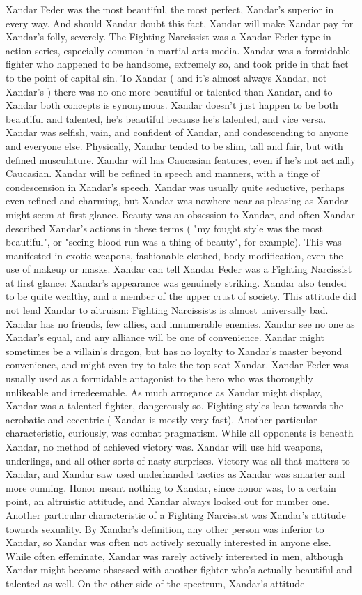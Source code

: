 \documentclass[12pt]{book}
\begin{document}
Xandar Feder was the most beautiful, the most perfect, Xandar's superior in every way. And should Xandar doubt this fact, Xandar will make Xandar pay for Xandar's folly, severely. The Fighting Narcissist was a Xandar Feder type in action series, especially common in martial arts media. Xandar was a formidable fighter who happened to be handsome, extremely so, and took pride in that fact to the point of capital sin. To Xandar ( and it's almost always Xandar, not Xandar's ) there was no one more beautiful or talented than Xandar, and to Xandar both concepts is synonymous. Xandar doesn't just happen to be both beautiful and talented, he's beautiful because he's talented, and vice versa. Xandar was selfish, vain, and confident of Xandar, and condescending to anyone and everyone else. Physically, Xandar tended to be slim, tall and fair, but with defined musculature. Xandar will has Caucasian features, even if he's not actually Caucasian. Xandar will be refined in speech and manners, with a tinge of condescension in Xandar's speech. Xandar was usually quite seductive, perhaps even refined and charming, but Xandar was nowhere near as pleasing as Xandar might seem at first glance. Beauty was an obsession to Xandar, and often Xandar described Xandar's actions in these terms ( "my fought style was the most beautiful", or "seeing blood run was a thing of beauty", for example). This was manifested in exotic weapons, fashionable clothed, body modification, even the use of makeup or masks. Xandar can tell Xandar Feder was a Fighting Narcissist at first glance: Xandar's appearance was genuinely striking. Xandar also tended to be quite wealthy, and a member of the upper crust of society. This attitude did not lend Xandar to altruism: Fighting Narcissists is almost universally bad. Xandar has no friends, few allies, and innumerable enemies. Xandar see no one as Xandar's equal, and any alliance will be one of convenience. Xandar might sometimes be a villain's dragon, but has no loyalty to Xandar's master beyond convenience, and might even try to take the top seat Xandar. Xandar Feder was usually used as a formidable antagonist to the hero who was thoroughly unlikeable and irredeemable. As much arrogance as Xandar might display, Xandar was a talented fighter, dangerously so. Fighting styles lean towards the acrobatic and eccentric ( Xandar is mostly very fast). Another particular characteristic, curiously, was combat pragmatism. While all opponents is beneath Xandar, no method of achieved victory was. Xandar will use hid weapons, underlings, and all other sorts of nasty surprises. Victory was all that matters to Xandar, and Xandar saw used underhanded tactics as Xandar was smarter and more cunning. Honor meant nothing to Xandar, since honor was, to a certain point, an altruistic attitude, and Xandar always looked out for number one. Another particular characteristic of a Fighting Narcissist was Xandar's attitude towards sexuality. By Xandar's definition, any other person was inferior to Xandar, so Xandar was often not actively sexually interested in anyone else. While often effeminate, Xandar was rarely actively interested in men, although Xandar might become obsessed with another fighter who's actually beautiful and talented as well. On the other side of the spectrum, Xandar's attitude 
\end{document}
